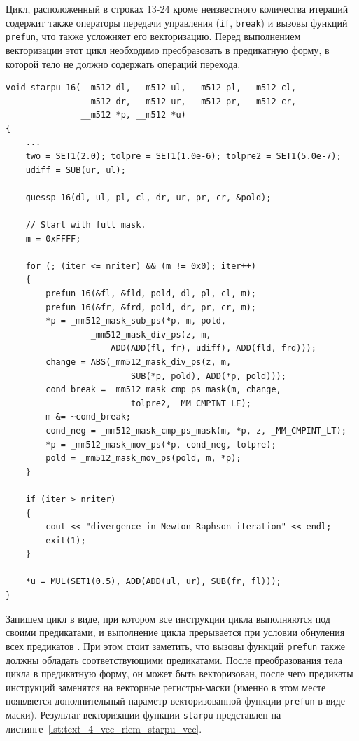 Цикл, расположенный в строках 13-24 кроме неизвестного количества итераций содержит также операторы передачи управления (\texttt{if}, \texttt{break}) и вызовы функций \texttt{prefun}, что также усложняет его векторизацию.
Перед выполнением векторизации этот цикл необходимо преобразовать в предикатную форму\label{term:predicate_view3}, в которой тело не должно содержать операций перехода.

\begin{lstlisting}[caption={Векторизованная версия функции \texttt{starpu}.},label={lst:text_4_vec_riem_starpu_vec}]
void starpu_16(__m512 dl, __m512 ul, __m512 pl, __m512 cl,
               __m512 dr, __m512 ur, __m512 pr, __m512 cr,
               __m512 *p, __m512 *u)
{
    ...
    two = SET1(2.0); tolpre = SET1(1.0e-6); tolpre2 = SET1(5.0e-7);
    udiff = SUB(ur, ul);

    guessp_16(dl, ul, pl, cl, dr, ur, pr, cr, &pold);

    // Start with full mask.
    m = 0xFFFF;

    for (; (iter <= nriter) && (m != 0x0); iter++)
    {
        prefun_16(&fl, &fld, pold, dl, pl, cl, m);
        prefun_16(&fr, &frd, pold, dr, pr, cr, m);
        *p = _mm512_mask_sub_ps(*p, m, pold,
                 _mm512_mask_div_ps(z, m,
                     ADD(ADD(fl, fr), udiff), ADD(fld, frd)));
        change = ABS(_mm512_mask_div_ps(z, m,
                         SUB(*p, pold), ADD(*p, pold)));
        cond_break = _mm512_mask_cmp_ps_mask(m, change,
                         tolpre2, _MM_CMPINT_LE);
        m &= ~cond_break;
        cond_neg = _mm512_mask_cmp_ps_mask(m, *p, z, _MM_CMPINT_LT);
        *p = _mm512_mask_mov_ps(*p, cond_neg, tolpre);
        pold = _mm512_mask_mov_ps(pold, m, *p);
    }

    if (iter > nriter)
    {
        cout << "divergence in Newton-Raphson iteration" << endl;
        exit(1);
    }

    *u = MUL(SET1(0.5), ADD(ADD(ul, ur), SUB(fr, fl)));
}
\end{lstlisting}

Запишем цикл в виде, при котором все инструкции цикла выполняются под своими предикатами, и выполнение цикла прерывается при условии обнуления всех предикатов \cite{Krzikalla2026Vec}.
При этом стоит заметить, что вызовы функций \texttt{prefun} также должны обладать соответствующими предикатами.
После преобразования тела цикла в предикатную форму, он может быть векторизован, после чего предикаты инструкций заменятся на векторные регистры-маски (именно в этом месте появляется дополнительный параметр векторизованной функции \texttt{prefun} в виде маски).
Результат векторизации функции \texttt{starpu} представлен на листинге~\ref{lst:text_4_vec_riem_starpu_vec}.

